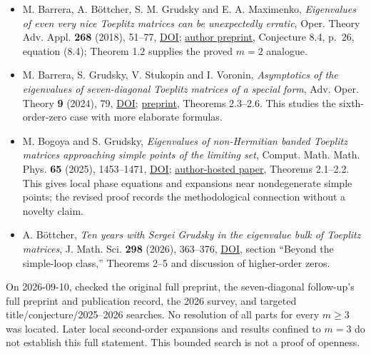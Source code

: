 \documentclass[11pt,a4paper]{article}
\makeatletter
\providecommand{\tightlist}{\setlength{\itemsep}{0pt}\setlength{\parskip}{0pt}}
\renewcommand{\subsection}{\Needspace{4\baselineskip}\@startsection{subsection}{2}{0pt}{9pt plus 1pt minus 1pt}{3pt}{\sffamily\bfseries\normalsize\color{ink}}}
\makeatother
\begin{document}
\begin{itemize}
\tightlist
\item
  M. Barrera, A. Böttcher, S. M. Grudsky and E. A. Maximenko,
  \emph{Eigenvalues of even very nice Toeplitz matrices can be
  unexpectedly erratic}, Oper. Theory Adv. Appl. \textbf{268} (2018),
  51--77, \href{https://doi.org/10.1007/978-3-319-75996-8_2}{DOI};
  \href{https://arxiv.org/abs/1710.05243}{author preprint}, Conjecture
  8.4, p.~26, equation (8.4); Theorem 1.2 supplies the proved \(m=2\)
  analogue.
\item
  M. Barrera, S. Grudsky, V. Stukopin and I. Voronin, \emph{Asymptotics
  of the eigenvalues of seven-diagonal Toeplitz matrices of a special
  form}, Adv. Oper. Theory \textbf{9} (2024), 79,
  \href{https://doi.org/10.1007/s43036-024-00374-1}{DOI};
  \href{https://arxiv.org/abs/2111.07196}{preprint}, Theorems 2.3--2.6.
  This studies the sixth-order-zero case with more elaborate formulas.
\item
  M. Bogoya and S. Grudsky, \emph{Eigenvalues of non-Hermitian banded
  Toeplitz matrices approaching simple points of the limiting set},
  Comput. Math. Math. Phys. \textbf{65} (2025), 1453--1471,
  \href{https://doi.org/10.1134/S0965542525700745}{DOI};
  \href{https://www.math.cinvestav.mx/~grudsky/Papers/162.pdf}{author-hosted
  paper}, Theorems 2.1--2.2. This gives local phase equations and
  expansions near nondegenerate simple points; the revised proof records
  the methodological connection without a novelty claim.
\item
  A. Böttcher, \emph{Ten years with Sergei Grudsky in the eigenvalue
  bulk of Toeplitz matrices}, J. Math. Sci. \textbf{298} (2026),
  363--376, \href{https://doi.org/10.1007/s10958-025-07833-x}{DOI},
  section ``Beyond the simple-loop class,'' Theorems 2--5 and discussion
  of higher-order zeros.
\end{itemize}

On 2026-09-10, checked the original full preprint, the seven-diagonal
follow-up's full preprint and publication record, the 2026 survey, and
targeted title/conjecture/2025--2026 searches. No resolution of all
parts for every \(m\ge3\) was located. Later local second-order
expansions and results confined to \(m=3\) do not establish this full
statement. This bounded search is not a proof of openness.

\hypertarget{audit-2026-09-10}{%
\subsection{Audit --- 2026-09-10}\label{audit-2026-09-10}}
\end{document}
